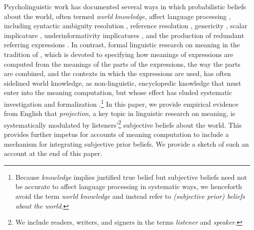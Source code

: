 \documentclass[OpenMind]{stjour}
\begin{document}
Psycholinguistic work has documented several ways in which probabilistic beliefs about the world, often termed {\em world knowledge}, affect  language processing  \citep[e.g.,][]{chambers-etal02,hagoort-etal2004,hald-etal2007,warren2007}, including syntactic ambiguity resolution \citep[e.g.,][]{chambers-etal04,bicknell-rohde2009}, reference resolution \citep[e.g.,][]{winograd1972, hanna-tanenhaus04}, genericity \citep[e.g.,][]{tessler-goodman2019},  scalar implicature \citep[e.g.,][]{degen-etal2015}, underinformativity implicatures \citep{kravtchenko2015}, and the production of redundant referring expressions \citep{mitchell2013, westerbeek2015, Rubio2016, DegenEtAl2020, sedivy2003}. In contrast, formal linguistic research on meaning in the tradition of \citet{montague73}, which is devoted to specifying how meanings of expressions are computed from the meanings of the parts of the expressions, the way the parts are combined, and the contexts in which the expressions are used, has often sidelined world knowledge, as non-linguistic, encyclopedic knowledge that must enter into the meaning computation, but whose effect has eluded systematic investigation and  formalization \citep[for relevant discussion see, e.g.][] {dowty86,peeters2000,beaver01,hobbs2019}.\footnote{Because {\em knowledge} implies justified true belief but subjective beliefs need not be accurate to affect language processing in systematic ways, we henceforth avoid the term {\em world knowledge} and instead refer to {\em (subjective prior) beliefs about the world}.}   In this paper, we provide empirical evidence from English that \emph{projection}, a key topic in linguistic research on meaning, is systematically modulated by listeners'\footnote{We include readers, writers, and signers in the terms {\em listener} and {\em speaker}.} subjective beliefs about the world. This provides further impetus for accounts of meaning computation to include a mechanism for integrating subjective prior beliefs. We provide a sketch of such an account at the end of this paper.
\end{document}
